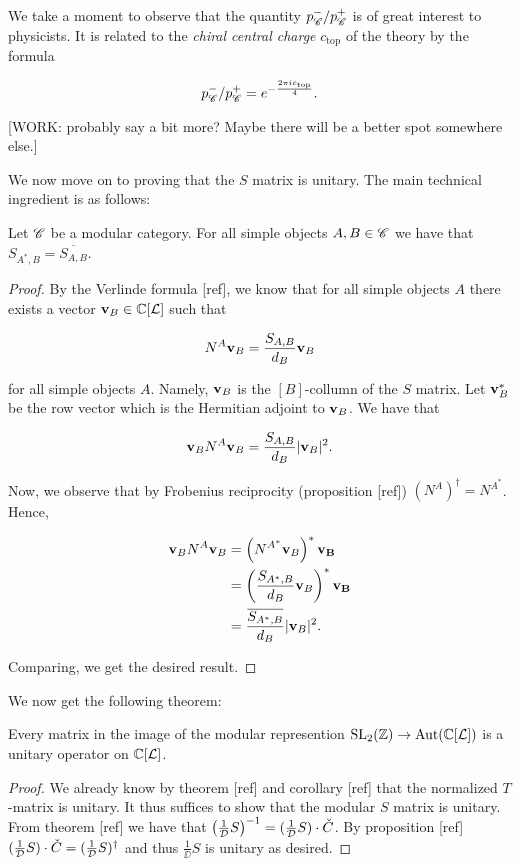 We take a moment to observe that the quantity $p_{\mathscr{C}}^-/p_{\mathscr{C}}^+$ is of great interest to physicists. It is related to the \textit{chiral central charge} $c_{\text{top}}$ of the theory by the formula

$$p_{\mathscr{C}}^-/p_{\mathscr{C}}^{+}=e^{-\frac{2\pi i c_{\text{top}}}{4}}.$$

[WORK: probably say a bit more? Maybe there will be a better spot somewhere else.]

We now move on to proving that the $S$ matrix is unitary. The main technical ingredient is as follows:

\begin{proposition} Let $\mathscr{C}$ be a modular category. For all simple objects $A,B\in \mathscr{C}$ we have that $S_{A^*,B}=\overline{S_{A,B}}$.
\end{proposition}
\begin{proof} By the Verlinde formula [ref], we know that for all simple objects $A$ there exists a vector $\bold{v}_B\in \mathbb{C}[\mathcal{L}]$ such that

$$N^{A} \bold{v}_B= \frac{S_{A,B}}{d_B}\bold{v}_B$$

for all simple objects $A$. Namely, $\bold{v}_B$ is the $[B]$-collumn of the $S$ matrix. Let $\bold{v}_B^{*}$ be the row vector which is the Hermitian adjoint to $\bold{v}_B$. We have that

$$\bold{v}_{B}N^{A}\bold{v}_B=\frac{S_{A,B}}{d_B}|\bold{v}_B|^2.$$

Now, we observe that by Frobenius reciprocity (proposition [ref]) $(N^{A})^{\dagger}=N^{A^*}$. Hence,

\begin{align*}
\bold{v}_{B}N^{A}\bold{v}_B&=\left(N^{A^*}\bold{v}_B\right)^*\bold{v_B}\\
&=\left(\frac{S_{A^*,B}}{d_B}\bold{v}_B\right)^*\bold{v_B}\\
&=\frac{\overline{S_{A^*,B}}}{d_B}|\bold{v}_B|^2.
\end{align*}

Comparing, we get the desired result.

\end{proof}

We now get the following theorem:

\begin{theorem} Every matrix in the image of the modular represention $\operatorname{SL}_2(\mathbb{Z})\to \operatorname{Aut}(\mathbb{C}[\mathcal{L}])$ is a unitary operator on $\mathbb{C}[\mathcal{L}]$.
\end{theorem}
\begin{proof} We already know by theorem [ref] and corollary [ref] that the normalized $T$-matrix is unitary. It thus suffices to show that the modular $S$ matrix is unitary. From theorem [ref] we have that $\left(\frac{1}{\mathcal{D}}S\right)^{-1} = (\frac{1}{\mathcal{D}}S) \cdot \check{C}$. By proposition [ref] $(\frac{1}{\mathcal{D}}S) \cdot \check{C} = (\frac{1}{\mathcal{D}}S)^{\dagger}$ and thus $\frac{1}{\DD}S$ is unitary as desired.
\end{proof}

